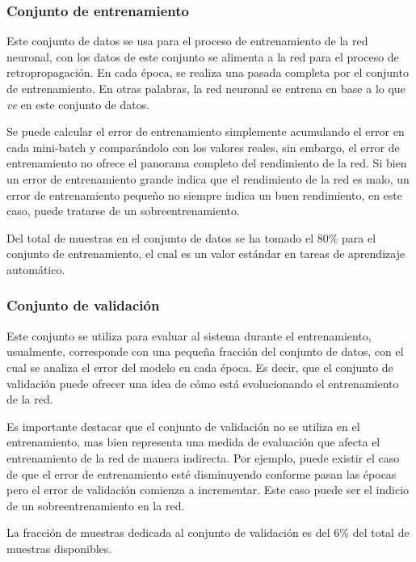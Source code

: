     

        \subsubsection{Conjunto de entrenamiento}
        Este conjunto de datos se usa para el proceso de entrenamiento de la red neuronal, con los datos de este conjunto 
        se alimenta a la red para el proceso de retropropagación. En cada época, se realiza una pasada completa por 
        el conjunto de entrenamiento. En otras palabras, la red neuronal se entrena en base a lo que \textit{ve} en este 
        conjunto de datos.

        Se puede calcular el error de entrenamiento simplemente acumulando el error en cada mini-batch y comparándolo con 
        los valores reales, sin embargo, el error de entrenamiento no ofrece el panorama completo del rendimiento de la red.
        Si bien un error de entrenamiento grande indica que el rendimiento de la red es malo, un error de entrenamiento pequeño 
        no siempre indica un buen rendimiento, en este caso, puede tratarse de un sobreentrenamiento.

        Del total de muestras en el conjunto de datos se ha tomado el 80\% para el conjunto de entrenamiento, el cual 
        es un valor estándar en tareas de aprendizaje automático.

        \subsubsection{Conjunto de validación}
        Este conjunto se utiliza para evaluar al sistema durante el entrenamiento, usualmente, corresponde con una pequeña fracción
        del conjunto de datos, con el cual se analiza el error del modelo en cada época. Es decir, que el conjunto de validación 
        puede ofrecer una idea de cómo está evolucionando el entrenamiento de la red. 

        Es importante destacar que el conjunto de validación no se utiliza en el entrenamiento, mas bien representa una medida 
        de evaluación que afecta el entrenamiento de la red de manera indirecta. Por ejemplo, puede existir el caso de que 
        el error de entrenamiento esté disminuyendo conforme pasan las épocas pero el error de validación comienza a incrementar. 
        Este caso puede ser el indicio de un sobreentrenamiento en la red. 

        La fracción de muestras dedicada al conjunto de validación es del 6\% del total de muestras disponibles. 

